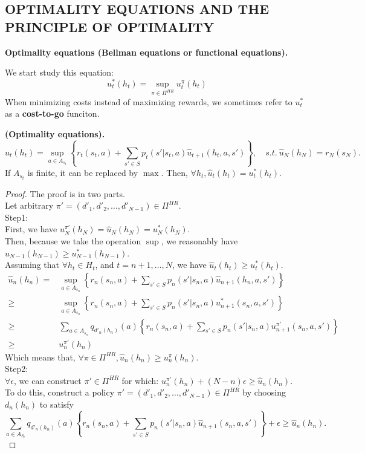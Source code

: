 \subsection{OPTIMALITY EQUATIONS AND THE PRINCIPLE OF OPTIMALITY}%
\label{sub:optimality_equations_and_the_principle_of_optimality}

\textbf{Optimality equations (Bellman equations or functional equations).}

We start study this equation:
\[ u^*_t(h_t) = \sup_{\pi \in \Pi^{HR}} u^\pi_t(h_t) \]
When minimizing costs instead of maximizing rewards, we sometimes refer to $ u^*_t $ as a \textbf{cost-to-go} funciton.

\begin{definition}
    \textbf{(Optimality equations).}
    \begin{equation}
       \hat u_t(h_t) = \sup_{a \in A_{s_t}} \left\{ r_t(s_t, a) + \sum^{}_{s' \in S} p_t(s' | s_t, a) \hat u_{t+1} (h_t, a, s') \right\}, \quad s.t.\ \hat u_N(h_N) = r_N(s_N).
    \end{equation}
    If $ A_{s_t} $ is finite, it can be replaced by $ \max $.
    Then, $ \forall h_t, \hat u_t(h_t) = u^*_t(h_t) $.
    \begin{proof}
        The proof is in two parts.\\
        Let arbitrary $ \pi' = (d'_1, d'_2, \ldots, d'_{N-1}) \in \Pi^{HR} $. \\ 
        Step1:\\
        First, we have $ u^{\pi'}_N(h_N) = \hat u_N(h_N) = u^*_N(h_N) $. \\
        Then, because we take the operation $ \sup $, we reasonably have $ \hat u_{N-1}(h_{N-1}) \ge u^*_{N-1}(h_{N-1}) $.\\
        Assuming that $ \forall h_t \in H_t$, and $t = n+1, \ldots, N$, we have $\hat u_t(h_t) \ge u^*_t(h_t) $.
        \begin{align*}
            \hat u_n(h_n) =& \sup_{a \in A_{s_n}} \left\{ r_n(s_n, a) + \sum^{}_{s' \in S} p_n(s' | s_n, a) \hat u_{n+1} (h_n, a, s') \right\} \\
            \ge& \sup_{a \in A_{s_n}} \left\{ r_n(s_n, a) + \sum^{}_{s' \in S} p_n(s' | s_n, a) u^*_{n+1} (s_n, a, s') \right\} \\
            \ge& \sum^{}_{a \in A_{s_n}} q_{d'_n(h_n)} (a) \left\{ r_n(s_n, a) + \sum^{}_{s' \in S} p_n(s' | s_n, a) u^{\pi'}_{n+1} (s_n, a, s') \right\} \\
            \ge& u^{\pi'}_n(h_n)
        \end{align*}
        Which means that, $ \forall \pi \in \Pi^{HR}, \hat u_n(h_n) \ge u^\pi_n(h_n) $.\\
        Step2:\\
        $ \forall \epsilon $, we can construct $ \pi' \in \Pi^{HR} $ for which: $ u^{\pi'}_n (h_n) + (N-n) \epsilon \ge \hat u_n(h_n)$.\\
        To do this, construct a policy $ \pi' = (d'_1, d'_2, \ldots, d'_{N-1}) \in \Pi^{HR} $ by choosing $ d_n(h_n) $ to satisfy
        \[
            \sum^{}_{a \in A_{S_t}} q_{d'_n(h_n)}(a) \left\{ r_n(s_n, a) + \sum^{}_{s'\in S} p_n(s' | s_n, a) \hat u_{n+1}(s_n, a, s') \right\} + \epsilon \ge \hat u_n(h_n). 
        \]
        

\end{proof}
\end{definition}
